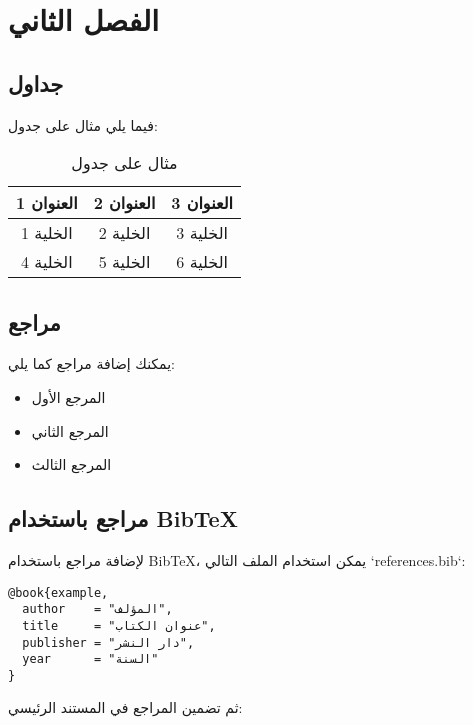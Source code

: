 
\chapter{الفصل الثاني}

\section{جداول}
فيما يلي مثال على جدول:

\begin{table}[h]
\centering
\begin{tabular}{|c|c|c|}
\hline
العنوان 1 & العنوان 2 & العنوان 3 \\
\hline
الخلية 1 & الخلية 2 & الخلية 3 \\
\hline
الخلية 4 & الخلية 5 & الخلية 6 \\
\hline
\end{tabular}
\caption{مثال على جدول}
\end{table}

\newpage

\section{مراجع}
يمكنك إضافة مراجع كما يلي:

\begin{itemize}
    \item المرجع الأول
    \item المرجع الثاني
    \item المرجع الثالث
\end{itemize}

\section{مراجع باستخدام BibTeX}
لإضافة مراجع باستخدام BibTeX، يمكن استخدام الملف التالي `references.bib`:

\begin{verbatim}
@book{example,
  author    = "المؤلف",
  title     = "عنوان الكتاب",
  publisher = "دار النشر",
  year      = "السنة"
}
\end{verbatim}

ثم تضمين المراجع في المستند الرئيسي:

\begin{verbatim}


\end{verbatim}

\newpage

